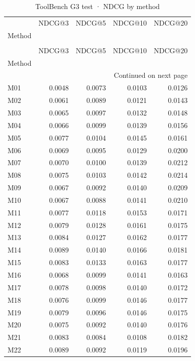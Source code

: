 \begin{longtable}{lrrrr}
\caption{ToolBench G3 test · NDCG by method} \label{tab:ToolBench-G3-test-family-family-ndcg} \\
\toprule
 & NDCG@3 & NDCG@5 & NDCG@10 & NDCG@20 \\
Method &  &  &  &  \\
\midrule
\endfirsthead
\caption[]{ToolBench G3 test · NDCG by method} \\
\toprule
 & NDCG@3 & NDCG@5 & NDCG@10 & NDCG@20 \\
Method &  &  &  &  \\
\midrule
\endhead
\midrule
\multicolumn{5}{r}{Continued on next page} \\
\midrule
\endfoot
\bottomrule
\endlastfoot
M01 & 0.0048 & 0.0073 & 0.0103 & 0.0126 \\
M02 & 0.0061 & 0.0089 & 0.0121 & 0.0143 \\
M03 & 0.0065 & 0.0097 & 0.0132 & 0.0148 \\
M04 & 0.0066 & 0.0099 & 0.0139 & 0.0156 \\
M05 & 0.0077 & 0.0104 & 0.0145 & 0.0161 \\
M06 & 0.0069 & 0.0095 & 0.0129 & 0.0200 \\
M07 & 0.0070 & 0.0100 & 0.0139 & 0.0212 \\
M08 & 0.0075 & 0.0103 & 0.0142 & 0.0214 \\
M09 & 0.0067 & 0.0092 & 0.0140 & 0.0209 \\
M10 & 0.0067 & 0.0088 & 0.0141 & 0.0210 \\
M11 & 0.0077 & 0.0118 & 0.0153 & 0.0171 \\
M12 & 0.0079 & 0.0128 & 0.0161 & 0.0175 \\
M13 & 0.0084 & 0.0127 & 0.0162 & 0.0177 \\
M14 & 0.0089 & 0.0140 & 0.0166 & 0.0181 \\
M15 & 0.0083 & 0.0133 & 0.0163 & 0.0177 \\
M16 & 0.0068 & 0.0099 & 0.0141 & 0.0163 \\
M17 & 0.0078 & 0.0098 & 0.0140 & 0.0172 \\
M18 & 0.0076 & 0.0099 & 0.0146 & 0.0177 \\
M19 & 0.0079 & 0.0096 & 0.0146 & 0.0175 \\
M20 & 0.0075 & 0.0092 & 0.0140 & 0.0176 \\
M21 & 0.0083 & 0.0084 & 0.0108 & 0.0182 \\
M22 & 0.0089 & 0.0092 & 0.0119 & 0.0196 \\

\end{longtable}
